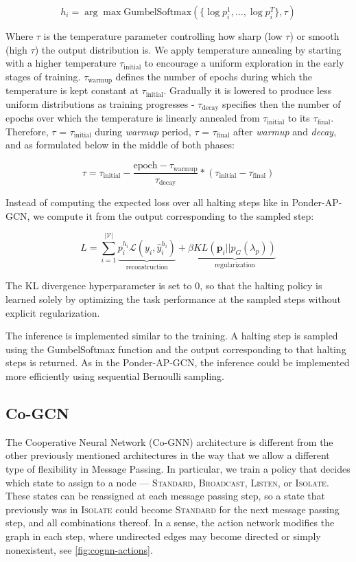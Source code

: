 \documentclass{gdl}
\begin{document}
$$
    h_i = \arg\max \text{GumbelSoftmax}(\{\log p_i^1,...,\log p_i^{T}\}, \tau)
$$

\noindent Where $\tau$ is the temperature parameter controlling how sharp (low $\tau$) or smooth (high $\tau$) the output distribution is. We apply temperature annealing by starting with a higher temperature $\tau_{\text{initial}}$ to encourage a uniform exploration in the early stages of training. $\tau_{\text{warmup}}$ defines the number of epochs during which the temperature is kept constant at $\tau_{\text{initial}}$. Gradually it is lowered to produce less uniform distributions as training progresses - $\tau_{\text{decay}}$ specifies then the number of epochs over which the temperature is linearly annealed from $\tau_{\text{initial}}$ to its $\tau_{\text{final}}$.
Therefore, $\tau$ = $\tau_{\text{initial}}$ during \textit{warmup} period, $\tau$ = $\tau_{\text{final}}$ after \textit{warmup} and \textit{decay}, and as formulated below in the middle of both phases:

$$
\tau = \tau_{\text{initial}} - \frac{\text{epoch} - \tau_{\text{warmup}}}{\tau_{\text{decay}}}  * (\tau_{\text{initial}} - \tau_{\text{final}})
$$

Instead of computing the expected loss over all halting steps like in Ponder-AP-GCN, we compute it from the output corresponding to the sampled step:

$$
L = \sum_{i=1}^{\mathcal{|V|}} \underbrace{p_i^{h_i} \mathcal{L}(y_i, \hat{y}_i^{h_i})}_{\text{reconstruction}} + \beta \underbrace{KL(\mathbf{p}_i || p_G(\lambda_p))}_{\text{regularization}}
$$

\noindent The KL divergence hyperparameter is set to 0, so that the halting policy is learned solely by optimizing the task performance at the sampled steps without explicit regularization. 

The inference is implemented similar to the training. A halting step is sampled using the GumbelSoftmax function and the output corresponding to that halting steps is returned. As in the Ponder-AP-GCN, the inference could be implemented more efficiently using sequential Bernoulli sampling.

\subsection{Co-GCN}
The Cooperative Neural Network (Co-GNN) \cite{finkelshtein2024} architecture is different from the other previously mentioned architectures in the way that we allow a different type of flexibility in Message Passing. In particular, we train a policy that decides which state to assign to a node --- \textsc{Standard}, \textsc{Broadcast}, \textsc{Listen}, or \textsc{Isolate}. These states can be reassigned at each message passing step, so a state that previously was in \textsc{Isolate} could become \textsc{Standard} for the next message passing step, and all combinations thereof. In a sense, the action network modifies the graph in each step, where undirected edges may become directed or simply nonexistent, see \autoref{fig:cognn-actions}.
\end{document}
